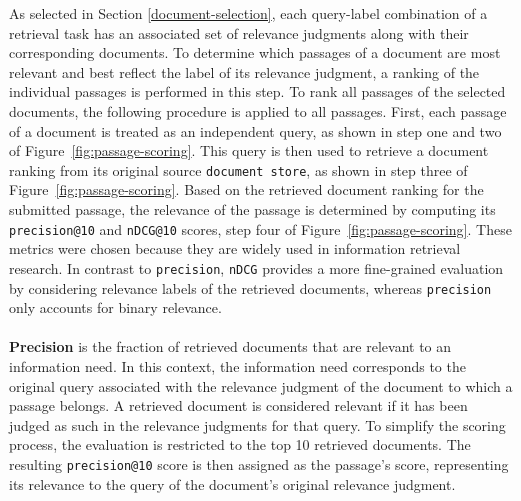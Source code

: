 As selected in Section \ref{document-selection}, each query-label combination of a retrieval task has an associated set of relevance judgments along with their corresponding documents. To determine which passages of a document are most relevant and best reflect the label of its relevance judgment, a ranking of the individual passages is performed in this step. To rank all passages of the selected documents, the following procedure is applied to all passages. First, each passage of a document is treated as an independent query, as shown in step one and two of Figure~\ref{fig:passage-scoring}. This query is then used to retrieve a document ranking from its original source \texttt{document store}, as shown in step three of \mbox{Figure~\ref{fig:passage-scoring}}. Based on the retrieved document ranking for the submitted passage, the relevance of the passage is determined by computing its \texttt{precision@10} and \texttt{nDCG@10} scores, step four of Figure~\ref{fig:passage-scoring}. These metrics were chosen because they are widely used in information retrieval research. In contrast to \texttt{precision}, \texttt{nDCG} provides a more fine-grained evaluation by considering relevance labels of the retrieved documents, whereas \texttt{precision} only accounts for binary relevance.
\\\\
\textbf{Precision} is the fraction of retrieved documents that are relevant to an information need. In this context, the information need corresponds to the original query associated with the relevance judgment of the document to which a passage belongs. A retrieved document is considered relevant if it has been judged as such in the relevance judgments for that query. To simplify the scoring process, the evaluation is restricted to the top 10 retrieved documents. The resulting \texttt{precision@10} score is then assigned as the passage's score, representing its relevance to the query of the document's original relevance judgment.
\\\\
